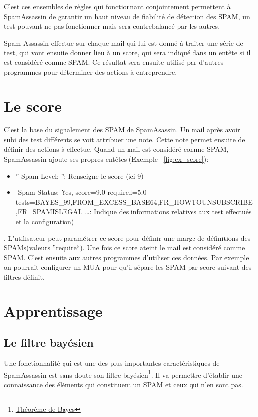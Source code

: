 \documentclass[a4paper,11pt]{article}
\begin{document}
\begin{description}
C'est ces ensembles de règles qui fonctionnant conjointement permettent à SpamAssassin de garantir un haut 
niveau de fiabilité de détection des SPAM, un test pouvant ne pas fonctionner mais sera contrebalancé par les autres.
 \end{description} 


Spam Assassin effectue sur chaque mail qui lui est donné à traiter une série de test, qui vont ensuite donner lieu à un score, qui sera indiqué dans un entête 
si il est considéré comme SPAM. 
Ce résultat sera ensuite utilisé par d'autres programmes pour déterminer des actions à entreprendre.


\section{Le score} \label{score}
C'est la base du signalement des SPAM de SpamAsassin. Un mail après avoir subi des test différents se voit attribuer une note. Cette note permet
ensuite de définir des actions à effectue. Quand un mail est considéré comme SPAM, SpamAssassin ajoute ses propres entêtes (Exemple ~\ref{fig:ex_score}):
\begin{itemize}
 \item ''-Spam-Level: \*\*\*\*\*\*\*\*\* '': Renseigne le score (ici 9)
 \item -Spam-Status: Yes, score=9.0 required=5.0 tests=BAYES\_99,FROM\_EXCESS\_BASE64,FR\_HOWTOUNSUBSCRIBE,FR\_SPAMISLEGAL \dots : Indique des informations relatives aux test effectués et la configuration)
\end{itemize}
. L'utilisateur peut paramétrer ce score pour définir une marge de définitions des SPAMs(valeurs ''require``). Une fois ce score ateint le mail est considéré comme SPAM.
C'est ensuite aux autres programmes d'utiliser ces données. Par exemple on pourrait configurer un MUA pour qu'il sépare 
les SPAM par score suivant des filtres définit. 

\label{baye}

\section{Apprentissage}

\subsection{Le filtre bayésien}

Une fonctionnalité qui est une des plus importantes caractéristiques de SpamAssassin est sans doute son filtre
bayésien\footnote{\href {https://fr.wikipedia.org/wiki/Th\%C3\%A9or\%C3\%A8me\_de_Bayes}{Théorème de Bayes}}.
Il va permettre d'établir une connaissance des éléments qui constituent un SPAM et ceux qui n'en sont pas.
\end{document}
